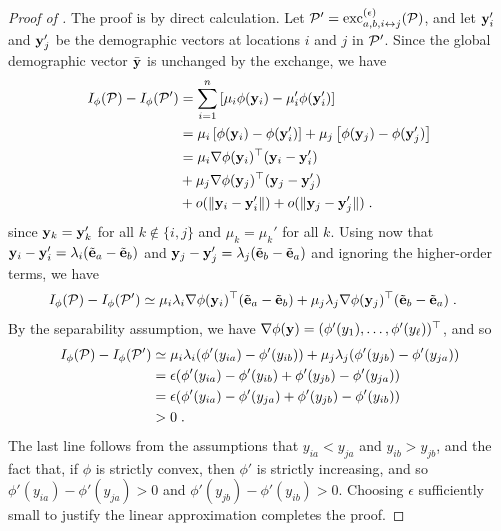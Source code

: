 \begin{proof}[Proof of ]
  The proof is by direct calculation. Let $\mathcal{P}' = \mathrm{exc}_{a,b, i\leftrightarrow j}^{(\epsilon)}(\mathcal{P})$, and let $\mathbf{y}_i'$ and $\mathbf{y}_j'$ be the demographic vectors at locations $i$ and $j$ in $\mathcal{P}'$. 
  Since the global demographic vector $\bar{\mathbf{y}}$ is unchanged by the exchange, we have
  \begin{align*}
    I_{\phi}(\mathcal{P}) - I_{\phi}(\mathcal{P}') &= \sum_{i = 1}^n \left[ \mu_i \phi(\mathbf{y}_i) - \mu_i' \phi(\mathbf{y}_i') \right] \\ 
    &= \mu_i\left[  \phi(\mathbf{y}_i) - \phi(\mathbf{y}_i') \right] + \mu_j\left[  \phi(\mathbf{y}_j)  - \phi(\mathbf{y}_j') \right] \\ 
    &= \mu_i \nabla \phi(\mathbf{y}_i)^{\top} (\mathbf{y}_i - \mathbf{y}_i') \\ 
    & + \mu_j \nabla \phi(\mathbf{y}_j)^{\top} (\mathbf{y}_j - \mathbf{y}_j') \\ 
    &+ o(\lVert \mathbf{y}_i - \mathbf{y}_i' \rVert) + o(\lVert \mathbf{y}_j - \mathbf{y}_j' \rVert)\;. 
  \end{align*}
  since $\mathbf{y}_k = \mathbf{y}_k'$ for all $k \notin \{i, j\}$ and $\mu_k = \mu_k'$ for all $k$.
  Using now that $\mathbf{y}_i - \mathbf{y}_i' = \lambda_i (\tilde{\mathbf{e}}_a - \tilde{\mathbf{e}}_b)$ and $\mathbf{y}_j - \mathbf{y}_j' = \lambda_j (\tilde{\mathbf{e}}_b - \tilde{\mathbf{e}}_a)$ and ignoring the higher-order terms, we have 
  \begin{align*}
    I_{\phi}(\mathcal{P}) - I_{\phi}(\mathcal{P}') &\simeq \mu_i \lambda_i \nabla \phi(\mathbf{y}_i)^{\top} (\tilde{\mathbf{e}}_a - \tilde{\mathbf{e}}_b) + \mu_j \lambda_j \nabla \phi(\mathbf{y}_j)^{\top} (\tilde{\mathbf{e}}_b - \tilde{\mathbf{e}}_a)\;. 
  \end{align*}
  By the separability assumption, we have $\nabla \phi(\mathbf{y}) = (\phi'(y_1), \ldots, \phi'(y_{\ell}))^{\top}$, and so 
  \begin{align*}
    I_{\phi}(\mathcal{P}) - I_{\phi}(\mathcal{P}') &\simeq \mu_i \lambda_i (\phi'(y_{ia}) - \phi'(y_{ib})) + \mu_j \lambda_j (\phi'(y_{jb}) - \phi'(y_{ja})) \\ 
    &= \epsilon (\phi'(y_{ia}) - \phi'(y_{ib}) + \phi'(y_{jb}) - \phi'(y_{ja})) \\ 
    &= \epsilon (\phi'(y_{ia}) - \phi'(y_{ja}) + \phi'(y_{jb}) - \phi'(y_{ib})) \\ 
    &> 0\;.
  \end{align*}
  The last line follows from the assumptions that $y_{ia} < y_{ja}$ and $y_{ib} > y_{jb}$, and the fact that, if $\phi$ is strictly convex, then $\phi'$ is strictly increasing, and so $\phi'(y_{ia}) - \phi'(y_{ja}) > 0$ and $\phi'(y_{jb}) - \phi'(y_{ib}) > 0$.
  Choosing $\epsilon$ sufficiently small to justify the linear approximation completes the proof. 
\end{proof}


